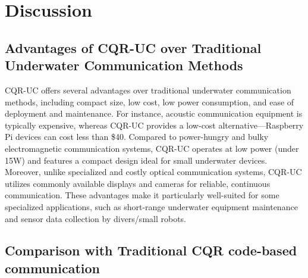 \documentclass[preprint,12pt]{elsarticle}
\begin{document}
\section{Discussion}
\subsection{Advantages of CQR-UC over Traditional Underwater Communication Methods}

CQR-UC offers several advantages over traditional underwater communication methods, including compact size, low cost, low power consumption, and ease of deployment and maintenance. For instance, acoustic communication equipment is typically expensive, whereas CQR-UC provides a low-cost alternative---Raspberry Pi devices can cost less than \$40. Compared to power-hungry and bulky electromagnetic communication systems, CQR-UC operates at low power (under 15W) and features a compact design ideal for small underwater devices. Moreover, unlike specialized and costly optical communication systems, CQR-UC utilizes commonly available displays and cameras for reliable, continuous communication. These advantages make it particularly well-suited for some specialized applications, such as short-range underwater equipment maintenance and sensor data collection by divers/small robots.

\subsection{Comparison with Traditional CQR code-based communication}
\end{document}
